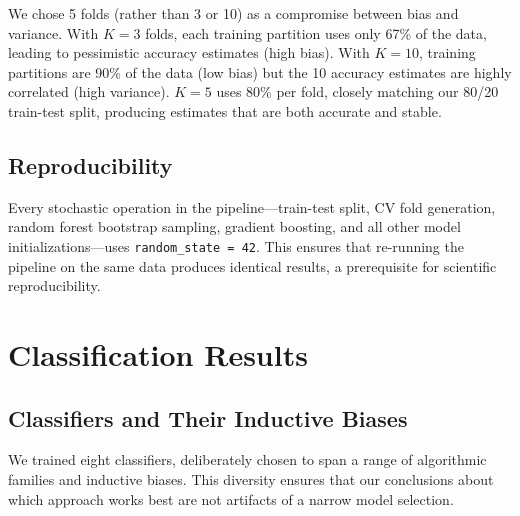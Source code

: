 \documentclass{article}
\begin{document}
We chose 5 folds (rather than 3 or 10) as a compromise between bias and variance. With $K=3$ folds, each training partition uses only 67\% of the data, leading to pessimistic accuracy estimates (high bias). With $K=10$, training partitions are 90\% of the data (low bias) but the 10 accuracy estimates are highly correlated (high variance). $K=5$ uses 80\% per fold, closely matching our 80/20 train-test split, producing estimates that are both accurate and stable.

\subsection{Reproducibility}
Every stochastic operation in the pipeline---train-test split, CV fold generation, random forest bootstrap sampling, gradient boosting, and all other model initializations---uses \texttt{random\_state = 42}. This ensures that re-running the pipeline on the same data produces identical results, a prerequisite for scientific reproducibility.

\section{Classification Results}

\subsection{Classifiers and Their Inductive Biases}
We trained eight classifiers, deliberately chosen to span a range of algorithmic families and inductive biases. This diversity ensures that our conclusions about which approach works best are not artifacts of a narrow model selection.
\end{document}
